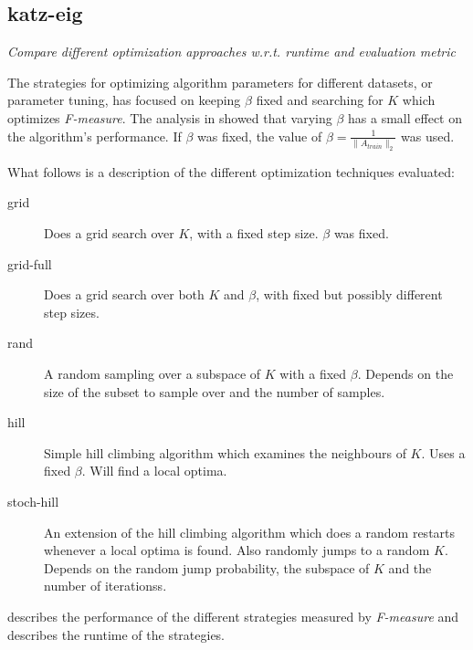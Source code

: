 
\subsection{katz-eig}

\textit{Compare different optimization approaches w.r.t. runtime and evaluation metric}

The strategies for optimizing algorithm parameters for different datasets, or parameter tuning, has focused on keeping $\beta$ fixed and searching for $K$ which optimizes \textit{F-measure}. The analysis in  showed that varying $\beta$ has a small effect on the algorithm's performance. If $\beta$ was fixed, the value of $\beta = \frac{1}{\|A_{train}\|_2}$ was used.

What follows is a description of the different optimization techniques evaluated:

\begin{description}
    \item[grid]
        Does a grid search over $K$, with a fixed step size. $\beta$ was fixed.
    \item[grid-full]
        Does a grid search over both $K$ and $\beta$, with fixed but possibly different step sizes.
    \item[rand]
        A random sampling over a subspace of $K$ with a fixed $\beta$. Depends on the size of the subset to sample over and the number of samples.
    \item[hill]
        Simple hill climbing algorithm which examines the neighbours of $K$. Uses a fixed $\beta$. Will find a local optima.
    \item[stoch-hill]
        An extension of the hill climbing algorithm which does a random restarts whenever a local optima is found. Also randomly jumps to a random $K$. Depends on the random jump probability, the subspace of $K$ and the number of iterationss.
\end{description}

 describes the performance of the different strategies measured by \textit{F-measure} and  describes the runtime of the strategies.

